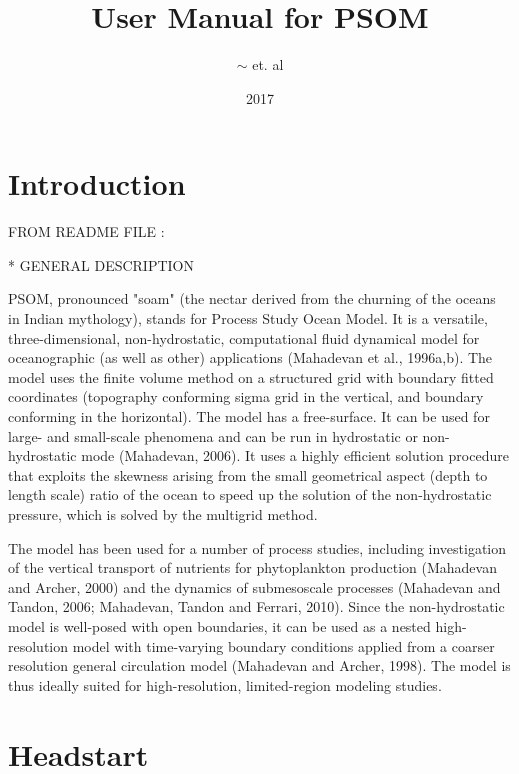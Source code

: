 \documentclass[12pt,letterpaper,titlepage]{article}
\begin{document}
	
	
	
	\title{User Manual for PSOM}
	\author{$\sim$ et. al}
	\date{2017}
	\maketitle

\tableofcontents
\pagebreak

\section{Introduction}


FROM README FILE :

* GENERAL DESCRIPTION

PSOM, pronounced "soam" (the nectar derived from the churning of the oceans in Indian mythology), stands for Process Study Ocean Model. 
It is a versatile, three-dimensional, non-hydrostatic, computational fluid dynamical model for oceanographic (as well as other) applications (Mahadevan et al., 1996a,b). 
The model uses the finite volume method on a structured grid with boundary fitted coordinates (topography conforming sigma grid in the vertical, and boundary conforming in the horizontal). 
The model has a free-surface. It can be used for large- and small-scale phenomena and can be run in hydrostatic or non-hydrostatic mode (Mahadevan, 2006). It uses a highly efficient solution procedure that exploits the skewness arising from the small geometrical aspect (depth to length scale) ratio of the ocean to speed up the solution of the non-hydrostatic pressure, which is solved by the multigrid method. 

The model has been used for a number of process studies, including investigation of the vertical transport of nutrients for phytoplankton production (Mahadevan and Archer, 2000) and the dynamics of submesoscale processes (Mahadevan and Tandon, 2006; Mahadevan, Tandon and Ferrari, 2010). Since the non-hydrostatic model is well-posed with open boundaries, it can be used as a nested high-resolution model with time-varying boundary conditions applied from a coarser resolution general circulation model (Mahadevan and Archer, 1998). The model is thus ideally suited for high-resolution, limited-region modeling studies. 




\section{Headstart}
\end{document}
